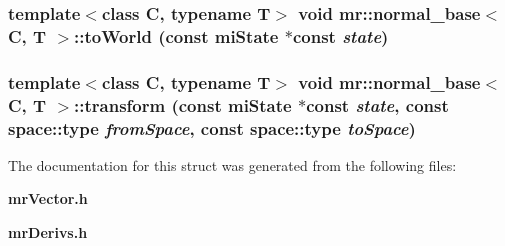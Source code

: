 \subsubsection{\setlength{\rightskip}{0pt plus 5cm}template$<$class C, typename T$>$ void {\bf mr::normal\_\-base}$<$ C, T $>$::to\-World (const mi\-State $\ast$const {\em state})\hspace{0.3cm}{\tt  [inline]}}\label{structmr_1_1normal__base_a2}


\subsubsection{\setlength{\rightskip}{0pt plus 5cm}template$<$class C, typename T$>$ void {\bf mr::normal\_\-base}$<$ C, T $>$::transform (const mi\-State $\ast$const {\em state}, const {\bf space::type} {\em from\-Space}, const {\bf space::type} {\em to\-Space})\hspace{0.3cm}{\tt  [inline]}}\label{structmr_1_1normal__base_a14}




The documentation for this struct was generated from the following files:\begin{CompactItemize}
\item 
{\bf mr\-Vector.h}\item 
{\bf mr\-Derivs.h}\end{CompactItemize}
